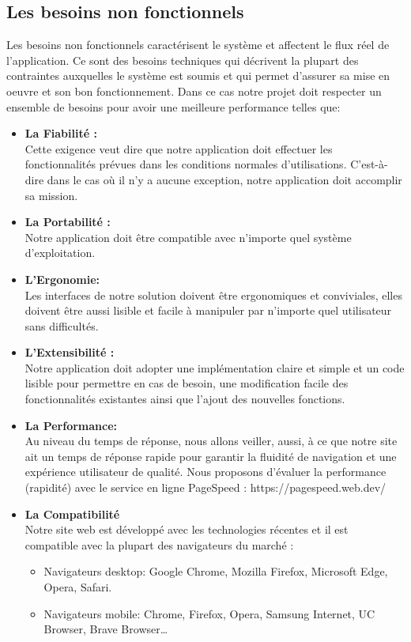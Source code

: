 \subsection{Les besoins non fonctionnels}
Les besoins non fonctionnels caractérisent le système et affectent le flux réel de l'application. Ce sont des besoins techniques qui décrivent la plupart des contraintes auxquelles le système est soumis et qui permet d'assurer sa mise en oeuvre et son bon fonctionnement.
Dans ce cas notre projet doit respecter un ensemble de besoins pour avoir une meilleure performance telles que:
\begin{itemize}
	\item \textbf{La Fiabilité :}\\
	Cette exigence veut dire que notre application doit effectuer les fonctionnalités prévues dans les
	conditions normales d’utilisations. C’est-à-dire dans le cas où il n'y a aucune exception, notre application
	doit accomplir sa mission.
	\item \textbf{La Portabilité :}\\
	Notre application doit être compatible avec n’importe quel système d’exploitation.
	\item \textbf{L'Ergonomie:}\\
	Les interfaces de notre solution doivent être ergonomiques et conviviales, elles doivent être aussi  lisible et facile à manipuler par n'importe quel utilisateur sans difficultés.
	\item \textbf{L'Extensibilité :}\\
    Notre application doit adopter une implémentation claire et simple et un code lisible pour permettre en cas de
	besoin, une modification facile des fonctionnalités existantes ainsi que l’ajout des nouvelles
	fonctions.
	\item \textbf{La Performance:}\\Au niveau du temps de réponse, nous allons veiller, aussi, à ce que notre site ait un temps de
	réponse rapide pour garantir la fluidité de navigation et une expérience utilisateur de qualité. Nous
	proposons d’évaluer la performance (rapidité) avec le service en ligne PageSpeed :
	https://pagespeed.web.dev/
	\item \textbf{La Compatibilité}\\
	Notre site web est développé avec les technologies récentes et il est compatible avec la plupart
	des navigateurs du marché :
	\begin{itemize}
		\item Navigateurs desktop: Google Chrome, Mozilla Firefox, Microsoft Edge, Opera, Safari. 
		\item Navigateurs mobile: Chrome, Firefox, Opera, Samsung Internet, UC Browser, Brave Browser…
		

\end{itemize}
\end{itemize}
